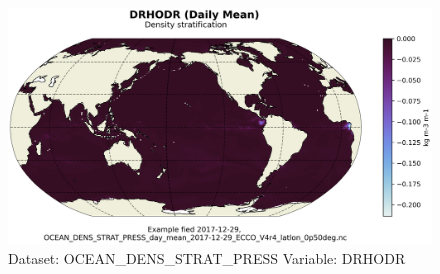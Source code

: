 \begin{figure}[H]
\centering
\includegraphics[scale=0.55]{../images/plots/latlon_plots/Ocean_Density_Stratification_and_Hydrostatic_Pressure/DRHODR.png}
\caption{Dataset: OCEAN\_DENS\_STRAT\_PRESS Variable: DRHODR}
\label{tab:table-OCEAN_DENS_STRAT_PRESS_DRHODR-Plot}
\end{figure}
\pagebreak
